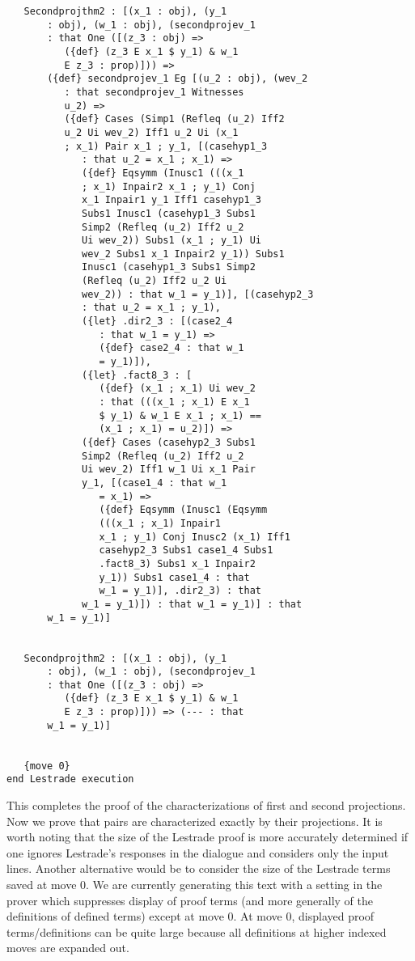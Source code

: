 \documentclass[12pt]{article}
\begin{document}
\begin{verbatim}
   Secondprojthm2 : [(x_1 : obj), (y_1 
       : obj), (w_1 : obj), (secondprojev_1 
       : that One ([(z_3 : obj) => 
          ({def} (z_3 E x_1 $ y_1) & w_1 
          E z_3 : prop)])) => 
       ({def} secondprojev_1 Eg [(u_2 : obj), (wev_2 
          : that secondprojev_1 Witnesses 
          u_2) => 
          ({def} Cases (Simp1 (Refleq (u_2) Iff2 
          u_2 Ui wev_2) Iff1 u_2 Ui (x_1 
          ; x_1) Pair x_1 ; y_1, [(casehyp1_3 
             : that u_2 = x_1 ; x_1) => 
             ({def} Eqsymm (Inusc1 (((x_1 
             ; x_1) Inpair2 x_1 ; y_1) Conj 
             x_1 Inpair1 y_1 Iff1 casehyp1_3 
             Subs1 Inusc1 (casehyp1_3 Subs1 
             Simp2 (Refleq (u_2) Iff2 u_2 
             Ui wev_2)) Subs1 (x_1 ; y_1) Ui 
             wev_2 Subs1 x_1 Inpair2 y_1)) Subs1 
             Inusc1 (casehyp1_3 Subs1 Simp2 
             (Refleq (u_2) Iff2 u_2 Ui 
             wev_2)) : that w_1 = y_1)], [(casehyp2_3 
             : that u_2 = x_1 ; y_1), 
             ({let} .dir2_3 : [(case2_4 
                : that w_1 = y_1) => 
                ({def} case2_4 : that w_1 
                = y_1)]), 
             ({let} .fact8_3 : [
                ({def} (x_1 ; x_1) Ui wev_2 
                : that (((x_1 ; x_1) E x_1 
                $ y_1) & w_1 E x_1 ; x_1) == 
                (x_1 ; x_1) = u_2)]) => 
             ({def} Cases (casehyp2_3 Subs1 
             Simp2 (Refleq (u_2) Iff2 u_2 
             Ui wev_2) Iff1 w_1 Ui x_1 Pair 
             y_1, [(case1_4 : that w_1 
                = x_1) => 
                ({def} Eqsymm (Inusc1 (Eqsymm 
                (((x_1 ; x_1) Inpair1 
                x_1 ; y_1) Conj Inusc2 (x_1) Iff1 
                casehyp2_3 Subs1 case1_4 Subs1 
                .fact8_3) Subs1 x_1 Inpair2 
                y_1)) Subs1 case1_4 : that 
                w_1 = y_1)], .dir2_3) : that 
             w_1 = y_1)]) : that w_1 = y_1)] : that 
       w_1 = y_1)]


   Secondprojthm2 : [(x_1 : obj), (y_1 
       : obj), (w_1 : obj), (secondprojev_1 
       : that One ([(z_3 : obj) => 
          ({def} (z_3 E x_1 $ y_1) & w_1 
          E z_3 : prop)])) => (--- : that 
       w_1 = y_1)]


   {move 0}
end Lestrade execution
\end{verbatim}

This completes the proof of the characterizations of first and second projections.  Now we prove that pairs are characterized exactly by their projections.  It is worth noting that
the size of the Lestrade proof is more accurately determined if one ignores Lestrade's responses in the dialogue and considers only the input lines.  Another alternative would be to consider the size of the Lestrade terms saved at move 0.  We are currently generating this text with a setting in the prover which suppresses display of proof terms
(and more generally of the definitions of defined terms) except at move 0.  At move 0, displayed proof terms/definitions can be quite large because all definitions at higher indexed moves are expanded out.
\end{document}

